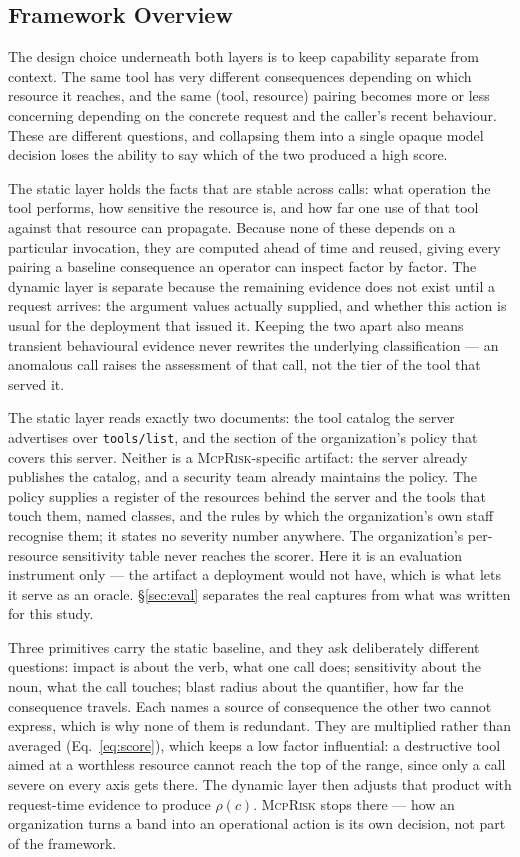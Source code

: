 \documentclass[sigconf]{acmart}
\newcommand{\framework}{\textsc{McpRisk}}
\begin{document}
\subsection{Framework Overview}
\label{sec:overview}

The design choice underneath both layers is to keep capability separate from
context. The same tool has very different consequences depending on which
resource it reaches, and the same (tool, resource) pairing becomes more or less
concerning depending on the concrete request and the caller's recent behaviour.
These are different questions, and collapsing them into a single opaque model
decision loses the ability to say which of the two produced a high score.

The static layer holds the facts that are stable across calls: what operation
the tool performs, how sensitive the resource is, and how far one use of that
tool against that resource can propagate. Because none of these depends on a
particular invocation, they are computed ahead of time and reused, giving every
pairing a baseline consequence an operator can inspect factor by factor. The
dynamic layer is separate because the remaining evidence does not exist until a
request arrives: the argument values actually supplied, and whether this action
is usual for the deployment that issued it. Keeping the
two apart also means transient behavioural evidence never rewrites the
underlying classification --- an anomalous call raises the assessment of that
call, not the tier of the tool that served it.

The static layer reads exactly two documents: the tool catalog the server
advertises over \texttt{tools/list}, and the section of the organization's
policy that covers this server. Neither is a \framework{}-specific artifact:
the server already publishes the catalog, and a security team already maintains
the policy. The policy supplies a register of the resources behind the server
and the tools that touch them, named classes, and
the rules by which the organization's own staff recognise them; it states no
severity number anywhere. The organization's per-resource sensitivity table
never reaches the scorer. Here it is an evaluation instrument only --- the
artifact a deployment would not have, which is what lets it serve as an oracle.
\S\ref{sec:eval} separates the real captures from what was written for this
study.

Three primitives carry the static baseline, and they ask deliberately different
questions: impact is about the verb, what one call does; sensitivity about the
noun, what the call touches; blast radius about the quantifier, how far the
consequence travels. Each names a source of consequence the other two cannot
express, which is why none of them is redundant. They are multiplied rather
than averaged (Eq.~\ref{eq:score}), which keeps a low factor influential: a
destructive tool aimed at a worthless resource cannot reach the top of the
range, since only a call severe on every axis gets there. The dynamic layer
then adjusts that product with request-time evidence to produce $\rho(c)$.
\framework{} stops there --- how an organization turns a band into an
operational action is its own decision, not part of the framework.
\end{document}
